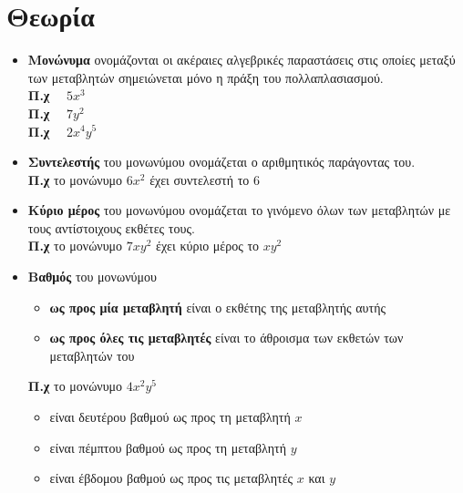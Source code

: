 \documentclass[a4paper,10pt]{report}
\begin{document}
\section*{Θεωρία  \hfill \small{}}
\begin{itemize}
 \item \textbf{Μονώνυμα} ονομάζονται οι ακέραιες αλγεβρικές παραστάσεις στις οποίες μεταξύ των μεταβλητών σημειώνεται 
       μόνο η πράξη του πολλαπλασιασμού.\\
       \textbf{Π.χ} $\quad 5x^{3}$ \\
       \textbf{Π.χ} $\quad 7y^{2}$ \\
       \textbf{Π.χ} $\quad 2x^{4}y^{5}$
 \item \textbf{Συντελεστής} του μονωνύμου ονομάζεται ο αριθμητικός παράγοντας του. \\
       \textbf{Π.χ} το μονώνυμο $6x^{2}$ έχει συντελεστή το $6$
 \item \textbf{Κύριο μέρος} του μονωνύμου ονομάζεται το γινόμενο όλων των μεταβλητών με τους 
       αντίστοιχους εκθέτες τους.\\
       \textbf{Π.χ} το μονώνυμο $7xy^{2}$ έχει κύριο μέρος το $xy^{2}$
 \item \textbf{Βαθμός} του μονωνύμου 
        \begin{itemize}
         \item  \textbf{ως προς μία μεταβλητή} είναι ο εκθέτης της μεταβλητής αυτής
         \item  \textbf{ως προς όλες τις μεταβλητές} είναι το άθροισμα των εκθετών των μεταβλητών του 
        \end{itemize}
       \textbf{Π.χ} το μονώνυμο $4x^{2}y^{5}$ 
       \begin{itemize}
        \item είναι δευτέρου βαθμού ως προς τη μεταβλητή $x$ 
        \item είναι πέμπτου βαθμού ως προς τη μεταβλητή $y$ 
        \item είναι έβδομου βαθμού ως προς τις μεταβλητές $x$ και  $y$ 
        \end{itemize}
\end{itemize}
\end{document}
